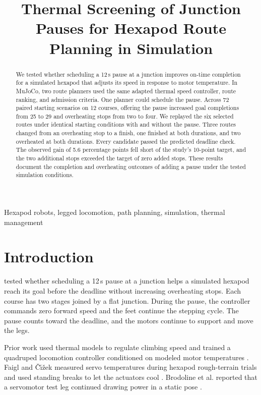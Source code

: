 \documentclass{ieeeaccess}
\begin{document}

\title{Thermal Screening of Junction Pauses for Hexapod Route Planning in Simulation}
\begin{abstract}
We tested whether scheduling a 12\,s pause at a junction improves on-time completion for a simulated hexapod that adjusts its speed in response to motor temperature. In MuJoCo, two route planners used the same adapted thermal speed controller, route ranking, and admission criteria. One planner could schedule the pause. Across 72 paired starting scenarios on 12 courses, offering the pause increased goal completions from 25 to 29 and overheating stops from two to four. We replayed the six selected routes under identical starting conditions with and without the pause. Three routes changed from an overheating stop to a finish, one finished at both durations, and two overheated at both durations. Every candidate passed the predicted deadline check. The observed gain of 5.6 percentage points fell short of the study's 10-point target, and the two additional stops exceeded the target of zero added stops. These results document the completion and overheating outcomes of adding a pause under the tested simulation conditions.
\end{abstract}

\begin{keywords}
Hexapod robots, legged locomotion, path planning, simulation, thermal management
\end{keywords}
\titlepgskip=-21pt
\maketitle

\section{Introduction}

 tested whether scheduling a 12\,s pause at a junction helps a simulated hexapod reach its goal before the deadline without increasing overheating stops. Each course has two stages joined by a flat junction. During the pause, the controller commands zero forward speed and the feet continue the stepping cycle. The pause counts toward the deadline, and the motors continue to support and move the legs.

Prior work used thermal models to regulate climbing speed \cite{trujillo2009} and trained a quadruped locomotion controller conditioned on modeled motor temperatures \cite{wan2026}. Faigl and \v{C}\'{\i}\v{z}ek measured servo temperatures during hexapod rough-terrain trials and used standing breaks to let the actuators cool \cite{faigl2019}. Brodoline et al. reported that a servomotor test leg continued drawing power in a static pose \cite{brodoline2024}.
\end{document}
